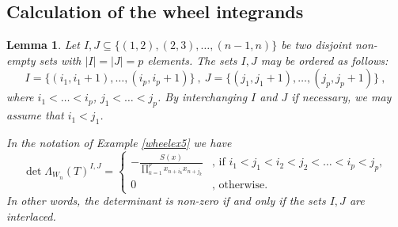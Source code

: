 \documentclass[10pt]{amsart}
\theoremstyle{plain}
\newtheorem{lem}[thm]{Lemma}
\newcommand{\0}{\color{blue}{\mathsf{0}}}
\begin{document}
\subsection{Calculation of the wheel integrands}
\begin{lem}\label{wheelfactorlem}
Let $I,J\subseteq\{(1,2) ,(2,3) ,\ldots,(n-1,n)\}$ be two disjoint  non-empty sets with $|I|=|J|=p$  elements.
The sets $I,J$ may be  ordered as follows: 
\[   I=\{(i_1, i_1+1),\ldots, (i_p,i_p+1)\} \ , \   J=\{(j_1, j_1+1),\ldots,(j_p, j_p+1)\}\ ,\]
where $i_1<\ldots<i_p$, $j_1<\ldots<j_p$. By interchanging $I$ and $J$ if necessary, we may assume that $i_1<j_1$.

In the notation of Example \ref{wheelex5} we have
\begin{equation}\label{detLeq}
\det\Lambda_{W_n}(T)^{I,J}=\left\{\begin{array}{cl}-\frac{S(x)}{\prod_{k=1}^px_{n+i_k}x_{n+j_k}}&\text{, if }i_1<j_1<i_2<j_2<\ldots<i_p<j_p,\\
0&\text{, otherwise.}\end{array}\right.
\end{equation}
In other words, the determinant is non-zero if and only if the sets $I,J$ are interlaced. 
  \end{lem}
\end{document}
